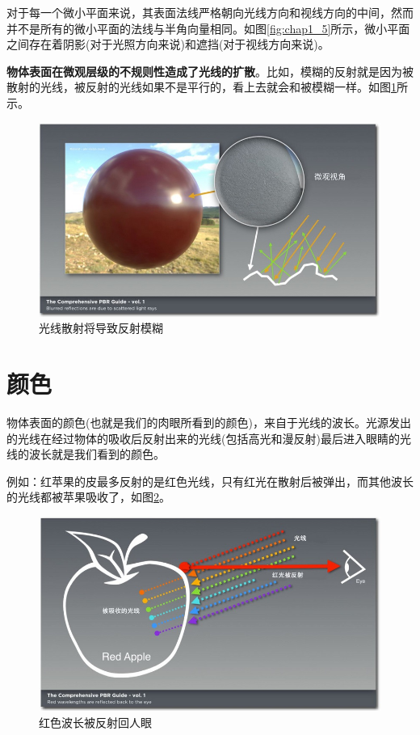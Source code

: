 对于每一个微小平面来说，其表面法线严格朝向光线方向和视线方向的中间，然而并不是所有的微小平面的法线与半角向量相同。如图\ref{fig:chap1_5}所示，微小平面之间存在着阴影(对于光照方向来说)和遮挡(对于视线方向来说)。

\textbf{物体表面在微观层级的不规则性造成了光线的扩散}。比如，模糊的反射就是因为被散射的光线，被反射的光线如果不是平行的，看上去就会和被模糊一样。如图\ref{fig:chap1_6}所示。

\begin{figure}[ht]
    \centering
	\includegraphics[width=\textwidth]{images/chap1_6.jpg}
	\caption{光线散射将导致反射模糊}
    \label{fig:chap1_6}
\end{figure}

\section{颜色}

物体表面的颜色(也就是我们的肉眼所看到的颜色)，来自于光线的波长。光源发出的光线在经过物体的吸收后反射出来的光线(包括高光和漫反射)最后进入眼睛的光线的波长就是我们看到的颜色。

例如：红苹果的皮最多反射的是红色光线，只有红光在散射后被弹出，而其他波长的光线都被苹果吸收了，如图\ref{fig:chap1_7}。

\begin{figure}[ht]
    \centering
	\includegraphics[width=\textwidth]{images/chap1_7.jpg}
	\caption{红色波长被反射回人眼}
    \label{fig:chap1_7}
\end{figure}


